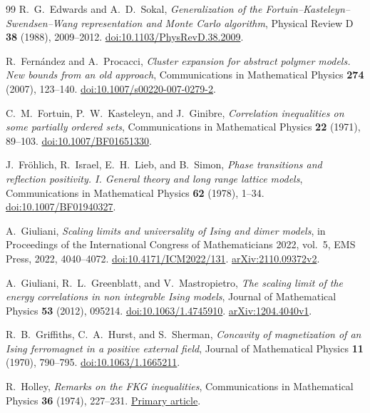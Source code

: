 \begin{thebibliography}{99}
R.~G.~Edwards and A.~D.~Sokal,
\emph{Generalization of the Fortuin--Kasteleyn--Swendsen--Wang representation and Monte Carlo algorithm},
Physical Review D \textbf{38} (1988), 2009--2012.
\href{https://doi.org/10.1103/PhysRevD.38.2009}{doi:10.1103/PhysRevD.38.2009}.

R.~Fern\'andez and A.~Procacci,
\emph{Cluster expansion for abstract polymer models. New bounds from an old approach},
Communications in Mathematical Physics \textbf{274} (2007), 123--140.
\href{https://doi.org/10.1007/s00220-007-0279-2}{doi:10.1007/s00220-007-0279-2}.

C.~M.~Fortuin, P.~W.~Kasteleyn, and J.~Ginibre,
\emph{Correlation inequalities on some partially ordered sets},
Communications in Mathematical Physics \textbf{22} (1971), 89--103.
\href{https://doi.org/10.1007/BF01651330}{doi:10.1007/BF01651330}.

J.~Fr\"ohlich, R.~Israel, E.~H.~Lieb, and B.~Simon,
\emph{Phase transitions and reflection positivity. I. General theory and long range lattice models},
Communications in Mathematical Physics \textbf{62} (1978), 1--34.
\href{https://doi.org/10.1007/BF01940327}{doi:10.1007/BF01940327}.

A.~Giuliani,
\emph{Scaling limits and universality of Ising and dimer models},
in Proceedings of the International Congress of Mathematicians 2022,
vol.~5, EMS Press, 2022, 4040--4072.
\href{https://doi.org/10.4171/ICM2022/131}{doi:10.4171/ICM2022/131}.
\href{https://arxiv.org/abs/2110.09372v2}{arXiv:2110.09372v2}.

A.~Giuliani, R.~L.~Greenblatt, and V.~Mastropietro,
\emph{The scaling limit of the energy correlations in non integrable
Ising models},
Journal of Mathematical Physics \textbf{53} (2012), 095214.
\href{https://doi.org/10.1063/1.4745910}{doi:10.1063/1.4745910}.
\href{https://arxiv.org/abs/1204.4040v1}{arXiv:1204.4040v1}.

R.~B.~Griffiths, C.~A.~Hurst, and S.~Sherman,
\emph{Concavity of magnetization of an Ising ferromagnet in a positive external field},
Journal of Mathematical Physics \textbf{11} (1970), 790--795.
\href{https://doi.org/10.1063/1.1665211}{doi:10.1063/1.1665211}.

R.~Holley,
\emph{Remarks on the FKG inequalities},
Communications in Mathematical Physics \textbf{36} (1974), 227--231.
\href{https://math.bme.hu/~balint/oktatas/perkolacio/percolation_papers/holley.pdf}{Primary article}.


\end{thebibliography}
